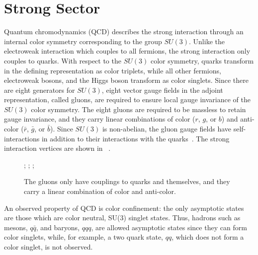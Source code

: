 

%
\section{Strong Sector}
Quantum chromodynamics (QCD) describes the strong interaction through an internal color symmetry corresponding to the group $SU(3)$. Unlike the electroweak interaction which couples to all fermions, the strong interaction only couples to quarks. With respect to the $SU(3)$ color symmetry, quarks transform in the defining representation as color triplets, while all other fermions, electroweak bosons, and the Higgs boson transform as color singlets. Since there are eight generators for $SU(3)$, eight vector gauge fields in the adjoint representation, called gluons, are required to ensure local gauge invariance of the $SU(3)$ color symmetry. The eight gluons are required to be massless to retain gauge invariance, and they carry linear combinations of color ($r$, $g$, or $b$) and anti-color ($\bar{r}$, $\bar{g}$, or $\bar{b}$). Since $SU(3)$ is non-abelian, the gluon gauge fields have self-interactions in addition to their interactions with the quarks~\cite{Srednicki}. The strong interaction vertices are shown in ~\Fig{\ref{fig:strong_feyn}}. 

\begin{figure}[tb]
\begin{center}
;
;
;
\caption[Gluon interactions]{The gluons only have couplings to quarks and themselves, and they carry a linear combination of color and anti-color.}
\label{fig:strong_feyn}
\end{center}
\end{figure}

An observed property of QCD is color confinement: the only asymptotic states are those which are color neutral, SU(3) singlet states. Thus, hadrons such as mesons, $q\bar{q}$, and baryons, $qqq$, are allowed asymptotic states since they can form color singlets, while, for example, a two quark state, $qq$, which does not form a color singlet, is not observed. 


